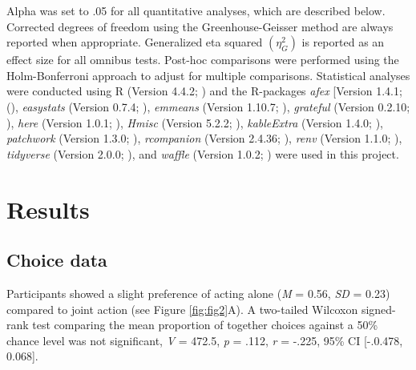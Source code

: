 \documentclass[
  man,
  floatsintext,
  longtable,
  nolmodern,
  notxfonts,
  notimes,
  colorlinks=true,linkcolor=blue,citecolor=blue,urlcolor=blue]{apa7}
\begin{document}
Alpha was set to .05 for all quantitative analyses, which are described
below. Corrected degrees of freedom using the Greenhouse-Geisser method
are always reported when appropriate. Generalized eta squared
\((\eta_{G}^{2})\) is reported as an effect size for all omnibus tests.
Post-hoc comparisons were performed using the Holm-Bonferroni approach
to adjust for multiple comparisons. Statistical analyses were conducted
using R (Version 4.4.2; ) and the
R-packages \emph{afex} {[}Version 1.4.1; (), \emph{easystats} (Version 0.7.4;
), \emph{emmeans} (Version
1.10.7; ), \emph{grateful} (Version
0.2.10; ),
\emph{here} (Version 1.0.1; ),
\emph{Hmisc} (Version 5.2.2; ),
\emph{kableExtra} (Version 1.4.0; ),
\emph{patchwork} (Version 1.3.0; ), \emph{rcompanion} (Version 2.4.36;
), \emph{renv} (Version
1.1.0; ), \emph{tidyverse}
(Version 2.0.0; ), and
\emph{waffle} (Version 1.0.2; ) were used in this project.

\section{Results}\label{results}

\subsection{Choice data}\label{choice-data-1}

Participants showed a slight preference of acting alone (\emph{M} =
0.56, \emph{SD} = 0.23) compared to joint action (see Figure
\ref{fig:fig2}A). A two-tailed Wilcoxon signed-rank test comparing the
mean proportion of together choices against a 50\% chance level was not
significant, \emph{V} = 472.5, \emph{p} = .112, \emph{r} = -.225, 95\%
CI {[}-.0.478, 0.068{]}.

\clearpage
\end{document}
